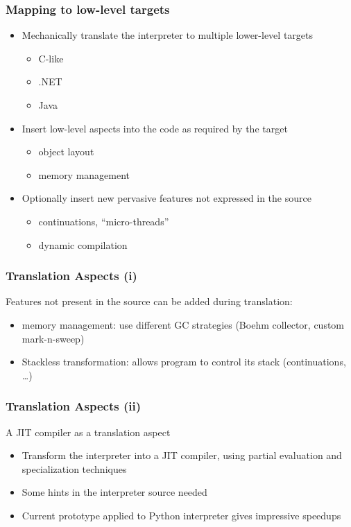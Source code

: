 \documentclass[utf8]{beamer}
\begin{document}
\begin{frame}
  \frametitle{Mapping to low-level targets}
  \begin{itemize}
  \item
    Mechanically translate the interpreter to multiple
    lower-level targets
    \begin{itemize}
    \item C-like
    \item .NET
    \item Java
    \end{itemize}
  \pause
  \item
    Insert low-level aspects into the code as required by
    the target
    \begin{itemize}
    \item object layout
    \item memory management
    \end{itemize}
  \pause
  \item
    Optionally insert new pervasive features not expressed
    in the source
    \begin{itemize}
    \item continuations, ``micro-threads''
    \item dynamic compilation
    \end{itemize}
  \end{itemize}
\end{frame}



\begin{frame}
  \frametitle{Translation Aspects (i)}
  Features not present in the source can be added during translation:
  \begin{itemize}
  \item
    \alert{memory management}: use different GC strategies (Boehm collector, custom mark-n-sweep)
  \item
    \alert{Stackless transformation}: allows program to control its stack (continuations, \dots)
  \end{itemize}
\end{frame}


\begin{frame}
  \frametitle{Translation Aspects (ii)}
  A \alert{JIT compiler} as a translation aspect
  \begin{itemize}
  \item
    Transform the interpreter into a JIT compiler, using partial evaluation and
    specialization techniques
  \item
    Some hints in the interpreter source needed
  \item
    Current prototype applied to Python interpreter gives impressive speedups
  \end{itemize}
\end{frame}
\end{document}
